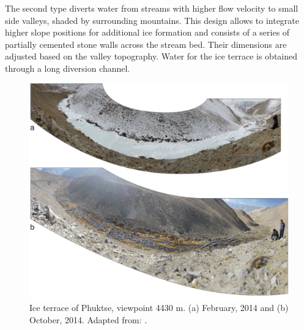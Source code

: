 The second type diverts water from streams with higher flow velocity to small side valleys, shaded by
surrounding mountains. This design allows to integrate higher slope positions for additional ice formation and
consists of a series of partially cemented stone walls across the stream bed. Their dimensions are adjusted
based on the valley topography. Water for the ice terrace is obtained through a long diversion channel.


\begin{figure}[htb]
	\centering
	\includegraphics[width=\textwidth]{figs/IT_example.png}
	\caption{Ice terrace of Phuktse, viewpoint 4430 m. (a) February, 2014 and (b) October, 2014. Adapted from:
		\citet{nusserSociohydrologyArtificialGlaciers2019}.}
	\label{fig:ITexample}
\end{figure}

%
%
%
%


